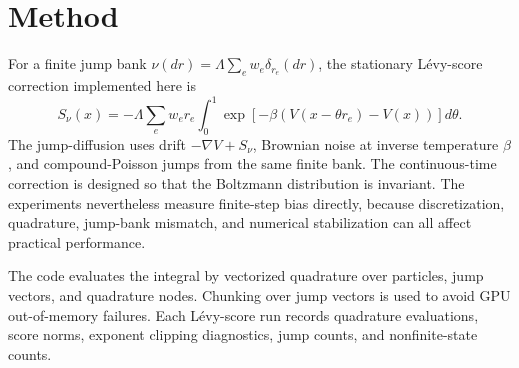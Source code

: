 \section{Method}
For a finite jump bank $\nu(dr)=\Lambda\sum_e w_e\delta_{r_e}(dr)$, the stationary L\'evy-score correction implemented here is
\[
S_\nu(x)=-\Lambda\sum_e w_e r_e\int_0^1\exp[-\beta(V(x-\theta r_e)-V(x))]d\theta.
\]
The jump-diffusion uses drift $-\nabla V+S_\nu$, Brownian noise at inverse temperature $\beta$, and compound-Poisson jumps from the same finite bank. The continuous-time correction is designed so that the Boltzmann distribution is invariant. The experiments nevertheless measure finite-step bias directly, because discretization, quadrature, jump-bank mismatch, and numerical stabilization can all affect practical performance.

The code evaluates the integral by vectorized quadrature over particles, jump vectors, and quadrature nodes. Chunking over jump vectors is used to avoid GPU out-of-memory failures. Each L\'evy-score run records quadrature evaluations, score norms, exponent clipping diagnostics, jump counts, and nonfinite-state counts.
